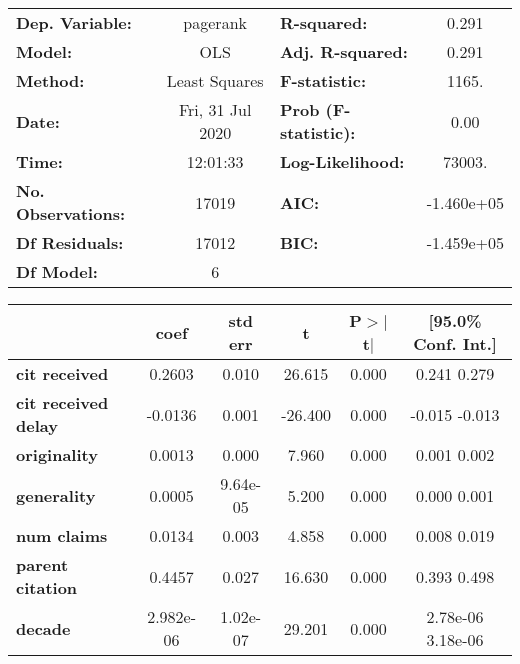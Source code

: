 \begin{center}
\begin{tabular}{lclc}
\toprule
\textbf{Dep. Variable:}     &     pagerank     & \textbf{  R-squared:         } &      0.291    \\
\textbf{Model:}             &       OLS        & \textbf{  Adj. R-squared:    } &      0.291    \\
\textbf{Method:}            &  Least Squares   & \textbf{  F-statistic:       } &      1165.    \\
\textbf{Date:}              & Fri, 31 Jul 2020 & \textbf{  Prob (F-statistic):} &      0.00     \\
\textbf{Time:}              &     12:01:33     & \textbf{  Log-Likelihood:    } &     73003.    \\
\textbf{No. Observations:}  &       17019      & \textbf{  AIC:               } &  -1.460e+05   \\
\textbf{Df Residuals:}      &       17012      & \textbf{  BIC:               } &  -1.459e+05   \\
\textbf{Df Model:}          &           6      & \textbf{                     } &               \\
\bottomrule
\end{tabular}
\begin{tabular}{lccccc}
                            & \textbf{coef} & \textbf{std err} & \textbf{t} & \textbf{P$>$$|$t$|$} & \textbf{[95.0\% Conf. Int.]}  \\
\midrule
\textbf{cit received}       &       0.2603  &        0.010     &    26.615  &         0.000        &         0.241     0.279       \\
\textbf{cit received delay} &      -0.0136  &        0.001     &   -26.400  &         0.000        &        -0.015    -0.013       \\
\textbf{originality}        &       0.0013  &        0.000     &     7.960  &         0.000        &         0.001     0.002       \\
\textbf{generality}         &       0.0005  &     9.64e-05     &     5.200  &         0.000        &         0.000     0.001       \\
\textbf{num claims}         &       0.0134  &        0.003     &     4.858  &         0.000        &         0.008     0.019       \\
\textbf{parent citation}    &       0.4457  &        0.027     &    16.630  &         0.000        &         0.393     0.498       \\
\textbf{decade}             &    2.982e-06  &     1.02e-07     &    29.201  &         0.000        &      2.78e-06  3.18e-06       \\

\end{tabular}
\end{center}
